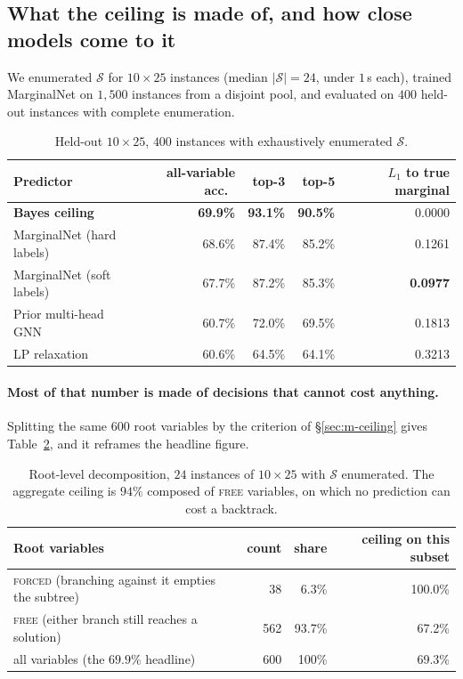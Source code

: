 \documentclass[12pt]{article}
\begin{document}
\subsection{What the ceiling is made of, and how close models come to it}
\label{sec:ceiling}

We enumerated $\mathcal{S}$ for $10\times25$ instances (median $|\mathcal{S}|=24$, under $1$\,s each), trained MarginalNet on $1{,}500$ instances from a disjoint pool, and evaluated on $400$ held-out instances with complete enumeration.

\begin{table}[h]
\centering
\begin{tabular}{lrrrr}
\toprule
Predictor & all-variable acc.\ & top-3 & top-5 & $L_1$ to true marginal \\
\midrule
\textbf{Bayes ceiling} & \textbf{69.9\%} & \textbf{93.1\%} & \textbf{90.5\%} & 0.0000 \\
MarginalNet (hard labels) & 68.6\% & 87.4\% & 85.2\% & 0.1261 \\
MarginalNet (soft labels) & 67.7\% & 87.2\% & 85.3\% & \textbf{0.0977} \\
Prior multi-head GNN & 60.7\% & 72.0\% & 69.5\% & 0.1813 \\
LP relaxation & 60.6\% & 64.5\% & 64.1\% & 0.3213 \\
\bottomrule
\end{tabular}
\caption{Held-out $10\times25$, $400$ instances with exhaustively enumerated $\mathcal{S}$.}
\label{tab:ceiling}
\end{table}

\paragraph{Most of that number is made of decisions that cannot cost anything.} Splitting the same $600$ root variables by the criterion of \S\ref{sec:m-ceiling} gives Table~\ref{tab:rootsplit}, and it reframes the headline figure.

\begin{table}[h]
\centering
\begin{tabular}{lrrr}
\toprule
Root variables & count & share & ceiling on this subset \\
\midrule
\textsc{forced} (branching against it empties the subtree) & 38 & 6.3\% & 100.0\% \\
\textsc{free} (either branch still reaches a solution) & 562 & 93.7\% & 67.2\% \\
\midrule
all variables (the $69.9\%$ headline) & 600 & 100\% & 69.3\% \\
\bottomrule
\end{tabular}
\caption{Root-level decomposition, $24$ instances of $10\times25$ with $\mathcal{S}$ enumerated. The aggregate ceiling is $94\%$ composed of \textsc{free} variables, on which no prediction can cost a backtrack.}
\label{tab:rootsplit}
\end{table}
\end{document}
